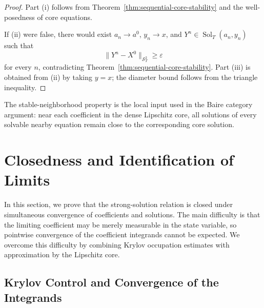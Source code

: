 \documentclass[12pt,oneside, reqno]{amsart}
\numberwithin{equation}{section}
\begin{document}
	\begin{proof}
		Part \textnormal{(i)} follows from
		Theorem~\ref{thm:sequential-core-stability} and the well-posedness of
		core equations.
		
		If \textnormal{(ii)} were false, there would exist
		$a_n\to a^0$, $y_n\to x$, and
		$Y^n\in\operatorname{Sol}_T(a_n,y_n)$ such that
		\[
		\|Y^n-X^0\|_{\mathcal S_T^2}\geq\varepsilon
		\]
		for every $n$, contradicting
		Theorem~\ref{thm:sequential-core-stability}. Part \textnormal{(iii)}
		is obtained from \textnormal{(ii)} by taking $y=x$; the diameter
		bound follows from the triangle inequality.
	\end{proof}
	
	The stable-neighborhood property is the local input used in the Baire
	category argument: near each coefficient in the dense Lipschitz core,
	all solutions of every solvable nearby equation remain close to the
	corresponding core solution.
	
	
	
	
	
	
	
	
	
	
	\section{Closedness and Identification of Limits}
	\label{sec:closedness-limits}
	
	In this section, we prove that the strong-solution relation is closed
	under simultaneous convergence of coefficients and solutions. The main
	difficulty is that the limiting coefficient may be merely measurable in
	the state variable, so pointwise convergence of the coefficient
	integrands cannot be expected. We overcome this difficulty by combining
	Krylov occupation estimates with approximation by the Lipschitz core.
	
	\subsection{Krylov Control and Convergence of the Integrands}
	
\end{document}
